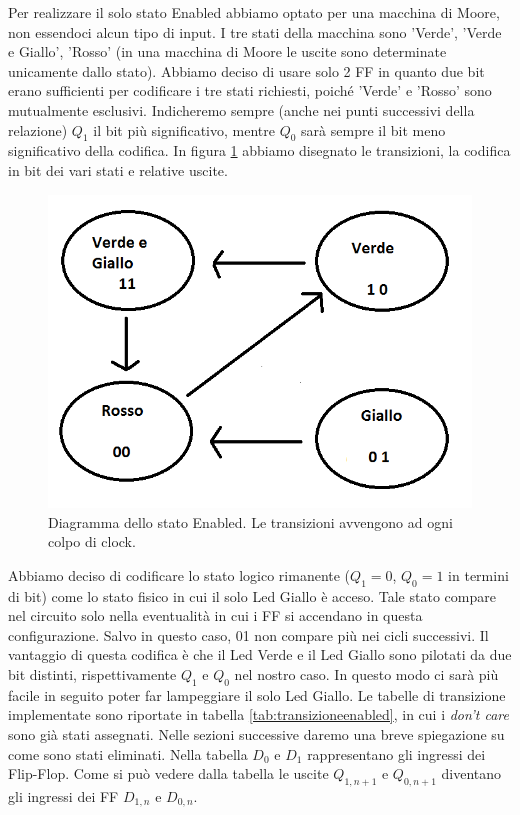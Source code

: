 \documentclass[10pt,a4paper]{article}
\begin{document}
Per realizzare il solo stato Enabled abbiamo optato per una macchina di Moore, non essendoci alcun tipo di input. I tre stati della macchina sono 'Verde', 'Verde e Giallo', 'Rosso' (in una macchina di Moore le uscite sono determinate unicamente dallo stato). Abbiamo deciso di usare solo 2 FF in quanto due bit erano sufficienti per codificare i tre stati richiesti, poiché 'Verde' e 'Rosso' sono mutualmente esclusivi. Indicheremo sempre (anche nei punti successivi della relazione) $Q_1$ il bit più significativo, mentre $Q_0$ sarà sempre il bit meno significativo della codifica. In figura \ref{fig:FSMenabled} abbiamo disegnato le transizioni, la codifica in bit dei vari stati e relative uscite.
\begin{figure}[!htb]
\centering
\includegraphics[scale=0.7]{FSMenabled.png}
\caption{Diagramma dello stato Enabled. Le transizioni avvengono ad ogni colpo di clock.\label{fig:FSMenabled}}
\end{figure}
Abbiamo deciso di codificare lo stato logico rimanente ($Q_1 = 0$, $Q_0 = 1$ in termini di bit) come lo stato fisico in cui il solo Led Giallo è acceso. Tale stato compare nel circuito solo nella eventualità in cui i FF si accendano in questa configurazione. Salvo in questo caso, 01 non compare più nei cicli successivi.
Il vantaggio di questa codifica è che il Led Verde e il Led Giallo sono pilotati da due bit distinti, rispettivamente $Q_1$ e $Q_0$ nel nostro caso. In questo modo ci sarà più facile in seguito poter far lampeggiare il solo Led Giallo.
Le tabelle di transizione implementate sono riportate in tabella \ref{tab:transizioneenabled}, in cui i \emph{don't care} sono già stati assegnati. Nelle sezioni successive daremo una breve spiegazione su come sono stati eliminati. Nella tabella $D_0$ e $D_1$ rappresentano gli ingressi dei Flip-Flop. Come si può vedere dalla tabella le uscite $Q_{1,n+1}$ e $Q_{0,n+1}$ diventano gli ingressi dei FF $D_{1, n}$ e $D_{0, n}$.
\end{document}
